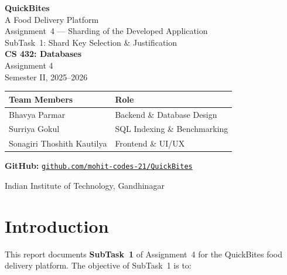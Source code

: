 \documentclass[12pt, a4paper]{article}
\renewcommand{\_}{\plainunderscore\allowbreak}
\newcommand{\projectname}{QuickBites}
\newcommand{\projectsubtitle}{A Food Delivery Platform}
\newcommand{\reportfocus}{Assignment~4 --- Sharding of the Developed Application}
\newcommand{\subtaskfocus}{SubTask~1: Shard Key Selection \& Justification}
\newcommand{\coursecode}{CS 432: Databases}
\newcommand{\assignmentinfo}{Assignment 4}
\newcommand{\semesterinfo}{Semester II, 2025--2026}
\newcommand{\repositoryurl}{https://github.com/mohit-codes-21/QuickBites}
\newcommand{\institutionname}{Indian Institute of Technology, Gandhinagar}
\begin{document}
\begin{titlepage}
\thispagestyle{empty}
\begin{center}
\vspace*{1.2cm}

{\Huge \textbf{\projectname}}\\[8pt]
{\LARGE \projectsubtitle}\\[12pt]
{\Large \reportfocus}\\[6pt]
{\large \subtaskfocus}\\[42pt]

{\Large \textbf{\coursecode}}\\[4pt]
{\Large \assignmentinfo}\\[28pt]

{\Large \semesterinfo}

\vfill

\begin{minipage}{0.84\textwidth}
\centering
\begin{tabular}{@{} L{5.0cm} L{7.0cm} @{}}
\toprule
\textbf{Team Members} & \textbf{Role} \\
\midrule
Bhavya Parmar        & Backend \& Database Design \\
Surriya Gokul        & SQL Indexing \& Benchmarking \\
Sonagiri Thoshith Kautilya & Frontend \& UI/UX \\
\bottomrule
\end{tabular}
\end{minipage}

\vspace{1.2cm}
{\large \textbf{GitHub:}
  \href{\repositoryurl}{\texttt{github.com/mohit-codes-21/QuickBites}}}

\vfill

{\Large \institutionname}
\end{center}
\end{titlepage}

\clearpage
\setcounter{page}{1}
\tableofcontents
\newpage

\section{Introduction}

This report documents \textbf{SubTask~1} of Assignment~4 for the QuickBites food
delivery platform. The objective of SubTask~1 is to:
\end{document}
